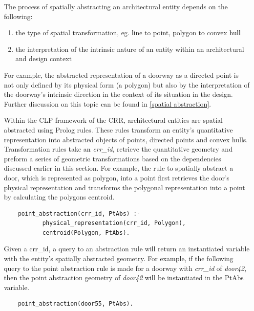 \documentclass[12pt]{ucthesis}
\begin{document}

The process of spatially abstracting an architectural entity depends on the following:
\begin{enumerate} \label{abs dependencies}
\item the type of spatial transformation, eg. line to point, polygon to convex hull
\item the interpretation of the intrinsic nature of an entity within an architectural and design context
\end{enumerate}
For example, the abstracted representation of a doorway as a directed point is not only defined by its physical form (a polygon) but also by the interpretation of the doorway's intrinsic direction in the context of its situation in the design. Further discussion on this topic can be found in \ref{spatial abstraction}.

Within the CLP framework of the CRR, architectural entities are spatial abstracted using Prolog rules. These rules transform an entity's quantitative representation into abstracted objects of points, directed points and convex hulls. Transformation rules take an \emph{crr\_id}, retrieve the quantitative geometry and preform a series of geometric transformations based on the dependencies discussed earlier in this section. For example, the rule to spatially abstract a door, which is represented as polygon, into a point first retrieves the door's physical representation and transforms the polygonal representation into a point by calculating the polygons centroid. 
\begin{verbatim}
    point_abstraction(crr_id, PtAbs) :-
           physical_representation(crr_id, Polygon),
           centroid(Polygon, PtAbs).
\end{verbatim} Given a crr\_id, a query to an abstraction rule will return an instantiated variable with the entity's spatially abstracted geometry. For example, if the following query to the point abstraction rule is made for a doorway with \emph{crr\_id} of \emph{door42}, then the point abstraction geometry of \emph{door42} will be instantiated in the PtAbs variable.
\begin{verbatim}
    point_abstraction(door55, PtAbs).
\end{verbatim}

\end{document}
